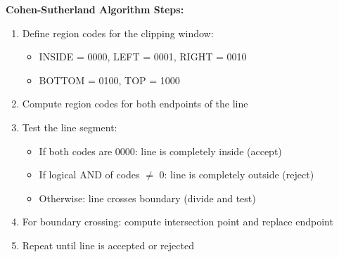 \documentclass[12pt,a4paper]{article}
\begin{document}
\textbf{Cohen-Sutherland Algorithm Steps:}
\begin{enumerate}
    \item Define region codes for the clipping window:
    \begin{itemize}
        \item INSIDE = 0000, LEFT = 0001, RIGHT = 0010
        \item BOTTOM = 0100, TOP = 1000
    \end{itemize}
    \item Compute region codes for both endpoints of the line
    \item Test the line segment:
    \begin{itemize}
        \item If both codes are 0000: line is completely inside (accept)
        \item If logical AND of codes $\neq$ 0: line is completely outside (reject)
        \item Otherwise: line crosses boundary (divide and test)
    \end{itemize}
    \item For boundary crossing: compute intersection point and replace endpoint
    \item Repeat until line is accepted or rejected
\end{enumerate}
\end{document}
